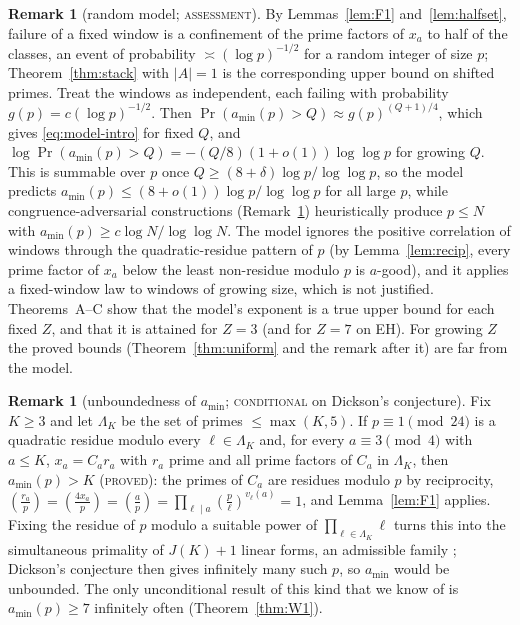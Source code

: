 \documentclass[11pt,reqno]{amsart}
\theoremstyle{definition}
\newtheorem{remark}[theorem]{Remark}
\newcommand{\amin}{a_{\min}}
\newcommand{\leg}[2]{\left(\frac{#1}{#2}\right)}
\newcommand{\status}[1]{\textup{\textsc{#1}}}
\begin{document}
\begin{remark}[random model; \status{assessment}]\label{rem:model}
By Lemmas~\ref{lem:F1} and~\ref{lem:halfset}, failure of a fixed window is
a confinement of the prime factors of $x_a$ to half of the classes, an
event of probability $\asymp(\log p)^{-1/2}$ for a random integer of size
$p$; Theorem~\ref{thm:stack} with $|A|=1$ is the corresponding upper bound
on shifted primes.  Treat the windows as independent, each failing with
probability $g(p)=c(\log p)^{-1/2}$.  Then
$\Pr(\amin(p)>Q)\approx g(p)^{(Q+1)/4}$, which gives
\eqref{eq:model-intro} for fixed $Q$, and
$\log\Pr(\amin(p)>Q)=-(Q/8)(1+o(1))\log\log p$ for growing $Q$.  This is
summable over $p$ once $Q\ge(8+\delta)\log p/\log\log p$, so the model
predicts $\amin(p)\le(8+o(1))\log p/\log\log p$ for all large $p$, while
congruence-adversarial constructions (Remark~\ref{rem:dickson})
heuristically produce $p\le N$ with $\amin(p)\ge c\log N/\log\log N$.  The
model ignores the positive correlation of windows through the
quadratic-residue pattern of $p$ (by Lemma~\ref{lem:recip}, every prime
factor of $x_a$ below the least non-residue modulo $p$ is $a$-good), and
it applies a fixed-window law to windows of growing size, which is not
justified.  Theorems~A--C show that the model's exponent is a true
upper bound for each fixed $Z$, and that it is attained for $Z=3$
(and for $Z=7$ on EH).  For growing $Z$ the proved bounds
(Theorem~\ref{thm:uniform} and the remark after it) are far from the
model.
\end{remark}

\begin{remark}[unboundedness of $\amin$; \status{conditional} on Dickson's conjecture]\label{rem:dickson}
Fix $K\ge3$ and let $\Lambda_K$ be the set of primes $\le\max(K,5)$.  If
$p\equiv1\pmod{24}$ is a quadratic residue modulo every $\ell\in\Lambda_K$
and, for every $a\equiv3\pmod4$ with $a\le K$, $x_a=C_ar_a$ with $r_a$ prime
and all prime factors of $C_a$ in $\Lambda_K$, then $\amin(p)>K$
(\status{proved}): the primes of $C_a$ are residues modulo $p$ by
reciprocity, $\leg{r_a}p=\leg{4x_a}p=\leg ap=\prod_{\ell\mid a}\leg p\ell^{v_\ell(a)}=1$,
and Lemma~\ref{lem:F1} applies.  Fixing the residue of $p$ modulo a
suitable power of $\prod_{\ell\in\Lambda_K}\ell$ turns this into the
simultaneous primality of $J(K)+1$ linear forms, an admissible family
\cite[Prop.~8.4]{PS}; Dickson's conjecture \cite{Dickson} then gives
infinitely many such $p$, so $\amin$ would be unbounded.  The only
unconditional result of this kind that we know of is $\amin(p)\ge7$
infinitely often (Theorem~\ref{thm:W1}).
\end{remark}
\end{document}

